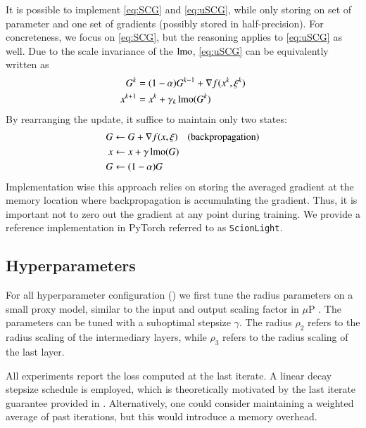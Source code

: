 It is possible to implement \ref{eq:SCG} and \ref{eq:uSCG}, while only storing on set of parameter and one set of gradients (possibly stored in half-precision).
For concreteness, we focus on \ref{eq:SCG}, but the reasoning applies to \ref{eq:uSCG} as well.
Due to the scale invariance of the $\operatorname{lmo}$, \ref{eq:uSCG} can be equivalently written as
\begin{equation*}
\begin{split}
G^{k} &= (1-\alpha)G^{k-1} + \nabla f(x^k,\xi^k) \\
x^{k+1} &= x^k + \gamma_k \operatorname{lmo}(G^{k})
\end{split}
\end{equation*}
By rearranging the update, it suffice to maintain only two states:
\begin{equation*}
\begin{split}
G &\leftarrow G + \nabla f(x,\xi) \quad \text{(backpropagation)}\\
x &\leftarrow x + \gamma \operatorname{lmo}(G) \\
G &\leftarrow (1-\alpha)G
\end{split}
\end{equation*}
Implementation wise this approach relies on storing the averaged gradient at the memory location where backpropagation is accumulating the gradient.
Thus, it is important not to zero out the gradient at any point during training.
We provide a reference implementation in PyTorch referred to as \texttt{ScionLight}.

\subsection{Hyperparameters}
For all hyperparameter configuration () 
we first tune the radius parameters on a small proxy model, similar to the input and output scaling factor in $\mu$P \citep{yang2021tensor}.
The parameters can be tuned with a suboptimal stepsize $\gamma$.
The radius $\rho_2$ refers to the radius scaling of the intermediary layers, while $\rho_3$ refers to the radius scaling of the last layer.

All experiments report the loss computed at the last iterate.
A linear decay stepsize schedule is employed, which is theoretically motivated by the last iterate guarantee provided in \citet{zamani2023exact}.
Alternatively, one could consider maintaining a weighted average of past iterations, but this would introduce a memory overhead.


